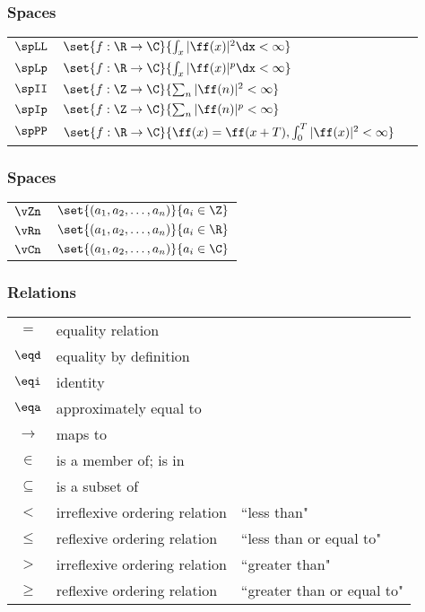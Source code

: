 \subsubsection*{Spaces}
\begin{tabular}{lll}
$\spLL$  & $\set{f:\R\to\C}{\int_x |\ff(x)|^2 \dx < \infty }$ \\
$\spLp$  & $\set{f:\R\to\C}{\int_x |\ff(x)|^p \dx < \infty }$ \\
$\spII$  & $\set{f:\Z\to\C}{\sum_n |\ff(n)|^2     < \infty }$ \\
$\spIp$  & $\set{f:\Z\to\C}{\sum_n |\ff(n)|^p     < \infty }$ \\
$\spPP$  & $\set{f:\R\to\C}{\ff(x)=\ff(x+T), \int_0^T |\ff(x)|^2     < \infty }$ 
\end{tabular}

\subsubsection*{Spaces}
\begin{tabular}{ll}
$\vZn$     & $\set{(a_1, a_2, \ldots, a_n)}{a_i\in\Z} $ \\
$\vRn$     & $\set{(a_1, a_2, \ldots, a_n)}{a_i\in\R} $ \\
$\vCn$     & $\set{(a_1, a_2, \ldots, a_n)}{a_i\in\C} $ 
\end{tabular}

\subsubsection*{Relations}
\begin{tabular}{cll}
$=$          & equality relation \\
$\eqd$       & equality by definition \\
$\eqi$       & identity \\
$\eqa$       & approximately equal to \\
$\to$        & maps to \\
$\in$        & is a member of; is in  \\
$\subseteq$  & is a subset of   \\
$<$          & irreflexive ordering relation &``less than"   \\
$\le$        & reflexive ordering relation   &``less than or equal to"   \\
$>$          & irreflexive ordering relation &``greater than"   \\
$\ge$        & reflexive ordering relation   &``greater than or equal to"   \\
\end{tabular}


